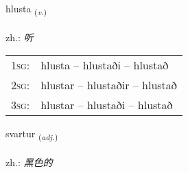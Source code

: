 \documentclass[frontgrid, backgrid]{flacards}\usepackage[]{graphicx}\usepackage[]{xcolor}
\begin{document}
\renewcommand{\flhead}{\vskip5pt \fboxsep=0pt {\small\bfseries\footnotesize Sagnorð | 动词}}
\renewcommand{\fcfoot}{\vskip5pt \fboxsep=0pt \hspace{2pt}{\small\bfseries\footnotesize 1K}}

\renewcommand{\blhead}{\vskip5pt {\small\bfseries\footnotesize Sagnorð | 动词 }}
\renewcommand{\bcfoot}{\vskip5pt \hspace{2pt}{\small\bfseries\footnotesize 1K}}


{hlusta \small{\textsubscript{(\textit{v.})}} \\[1ex] %
\textphonetic{[l̥ʏsta]} \\
zh.: \emph{听} \\  [2ex]
\renewcommand*{\arraystretch}{0.8}
\begin{tabular}{p{1cm}l}
\textsc{1sg}: & hlusta -- hlustaði -- hlustað \\ 
\textsc{2sg}: & hlustar -- hlustaðir -- hlustað \\ 
\textsc{3sg}: & hlustar -- hlustaði -- hlustað \\ 
\end{tabular}
}

\renewcommand{\flhead}{\vskip5pt \fboxsep=0pt {\small\bfseries\footnotesize Lýsingarorð | 形容词}}
\renewcommand{\fcfoot}{\vskip5pt \fboxsep=0pt \hspace{2pt}{\small\bfseries\footnotesize 1K}}

\renewcommand{\blhead}{\vskip5pt {\small\bfseries\footnotesize Lýsingarorð | 形容词 }}
\renewcommand{\bcfoot}{\vskip5pt \hspace{2pt}{\small\bfseries\footnotesize 1K}}


{svartur \small{\textsubscript{(\textit{adj.})}} \\[1ex] %
 \\
zh.: \emph{黑色的} \\  [2ex]
\renewcommand*{\arraystretch}{0.8}
}
\end{document}
